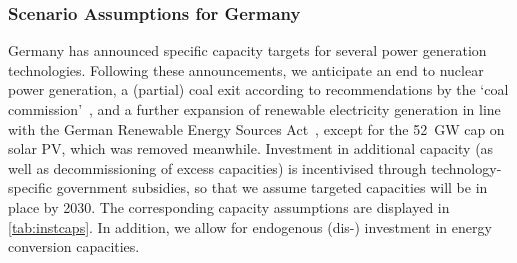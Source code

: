 \documentclass[review, 3p, times, 12pt, authoryear]{elsarticle}
\begin{document}
    \subsubsection{Scenario Assumptions for Germany} \label{subsubsec:assumptions-germany}
    Germany has announced specific capacity targets for several power generation technologies.
    Following these announcements, we anticipate an end to nuclear power generation, a (partial) coal exit according to recommendations by the `coal commission'~, and a further expansion of renewable electricity generation in line with the German Renewable Energy Sources Act~\citep{noauthor_renewable_2017}, except for the \SI{52}{\giga\watt} cap on solar PV, which was removed meanwhile.
    Investment in additional capacity (as well as decommissioning of excess capacities) is incentivised through technology-specific government subsidies, so that we assume targeted capacities will be in place by 2030.
    The corresponding capacity assumptions are displayed in \autoref{tab:instcaps}.
    In addition, we allow for endogenous (dis-) investment in energy conversion capacities.
\end{document}
